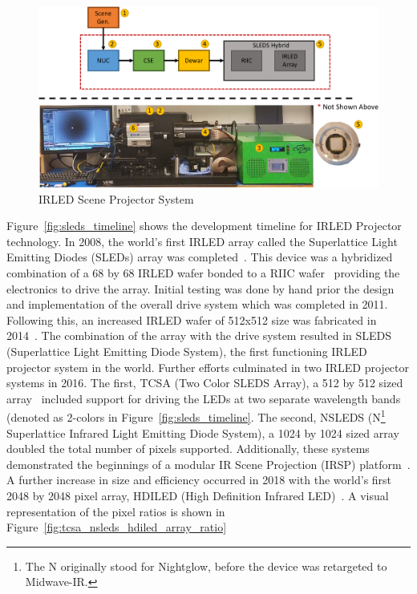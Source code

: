     \begin{figure}
        \centering
        \includegraphics[width=1.0\textwidth]{fig/sleds_system.pdf}
        \caption{IRLED Scene Projector System}
        \label{fig:sleds_system}
    \end{figure}

    Figure~\ref{fig:sleds_timeline} shows the development timeline for IRLED Projector technology. In 2008, the world's first IRLED array called the Superlattice Light Emitting Diodes (SLEDs) array was completed~\cite{AhmedEtAl2019}. This device was a hybridized combination of a 68 by 68 IRLED wafer bonded to a RIIC wafer~\cite{DasEtAl2009} providing the electronics to drive the array. Initial testing was done by hand prior the design and implementation of the overall drive system which was completed in 2011. Following this, an increased IRLED wafer of 512x512 size was fabricated in 2014~\cite{NortonEtAl2013}. The combination of the array with the drive system resulted in SLEDS (Superlattice Light Emitting Diode System), the first functioning IRLED projector system in the world. Further efforts culminated in two IRLED projector systems in 2016. The first, TCSA (Two Color SLEDS Array), a 512 by 512 sized array~\cite{McGeeEtAl2015, EjzakEtAl2016, EjzakEtAl2016_2, EjzakEtAl2017, RickerEtAl2017} included support for driving the LEDs at two separate wavelength bands (denoted as 2-colors in Figure~\ref{fig:sleds_timeline}. The second, NSLEDS (N\footnote{The N originally stood for Nightglow, before the device was retargeted to Midwave-IR.} Superlattice Infrared Light Emitting Diode System), a 1024 by 1024 sized array~\cite{BenedictEtAl2017,AhmedEtAl2020} doubled the total number of pixels supported. Additionally, these systems demonstrated the beginnings of a modular IR Scene Projection (IRSP) platform~\cite{BrowningEtAl2019}. A further increase in size and efficiency occurred in 2018 with the world's first 2048 by 2048 pixel array, HDILED (High Definition Infrared LED)~\cite{BenedictEtAl2018}. A visual representation of the pixel ratios is shown in Figure~\ref{fig:tcsa_nsleds_hdiled_array_ratio}

